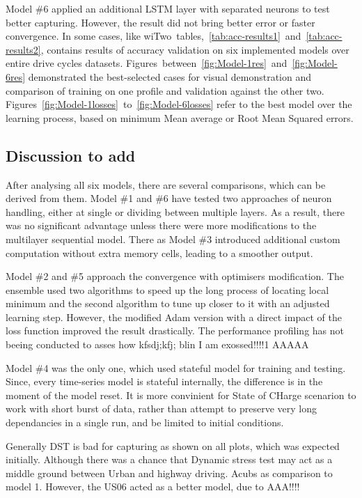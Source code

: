%
%
Model \#6 applied an additional LSTM layer with separated neurons to test better capturing.
However, the result did not bring better error or faster convergence.
In some cases, like wi\mbox{Two tables, \ref{tab:acc-results1} and \ref{tab:acc-results2}}, contains results of accuracy validation on six implemented models over entire drive cycles datasets.
\mbox{Figures between \ref{fig:Model-1res} and \ref{fig:Model-6res}} demonstrated the best-selected cases for visual demonstration and comparison of training on one profile and validation against the other two.
\mbox{Figures \ref{fig:Model-1losses} to \ref{fig:Model-6losses}} refer to the best model over the learning process, based on minimum Mean average or Root Mean Squared errors.

%
%
\subsection{Discussion to add}
After analysing all six models, there are several comparisons, which can be derived from them.
Model \#1 and \#6 have tested two approaches of neuron handling, either at single or dividing between multiple layers.
As a result, there was no significant advantage unless there were more modifications to the multilayer sequential model.
There as Model \#3 introduced additional custom computation without extra memory cells, leading to a smoother output.

%
%
Model \#2 and \#5 approach the convergence with optimisers modification.
The ensemble used two algorithms to speed up the long process of locating local minimum and the second algorithm to tune up closer to it with an adjusted learning step.
However, the modified Adam version with a direct impact of the loss function improved the result drastically.
The performance profiling has not beeing conducted to asses how kfsdj;kfj; blin I am exossed!!!!1 AAAAA

%
Model \#4 was the only one, which used stateful model for training and testing.
Since, every time-series model is stateful internally, the difference is in the moment of the model reset.
It is more convinient for State of CHarge scenarion to work with short burst of data, rather than attempt to preserve very long dependancies in a single run, and be limited to initial conditions.

%
%
Generally DST is bad for capturing as shown on all plots, which was expected initially. Although there was a chance that Dynamic stress test may act as a middle ground between Urban and highway driving.
Acubs as comparison to model 1.
However, the US06 acted as a better model, due to AAA!!!!

